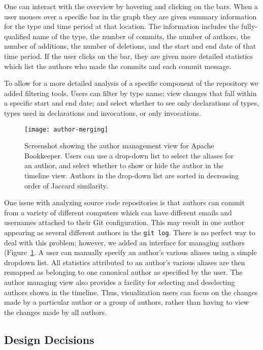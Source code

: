 One can interact with the overview by hovering and clicking on the bars. When a user mouses over a specific bar in the graph they are given summary information for the type and time period at that location. The information includes the fully-qualified name of the type, the number of commits, the number of authors, the number of additions, the number of deletions, and the start and end date of that time period. If the user clicks on the bar, they are given more detailed statistics which list the authors who made the commits and each commit message. 

To allow for a more detailed analysis of a specific component of the repository we added filtering tools. Users can filter by type name; view changes that fall within a specific start and end date; and select whether to see only declarations of types, types used in declarations and invocations, or only invocations.

\begin{figure}[tb]
\centering
\texttt{[image: author-merging]}
\caption{Screenshot showing the author management view for Apache Bookkeeper. Users can use a drop-down list to select the aliases for an author, and select whether to show or hide the author in the timeline view. Authors in the drop-down list are sorted in decreasing order of Jaccard similarity.}
\label{fig:author-merging}
\end{figure}

One issue with analyzing source code repositories is that authors can commit from a variety of different computers which can have different emails and usernames attached to their Git configuration. This may result in one author appearing as several different authors in the \texttt{git log}. There is no perfect way to deal with this problem; however, we added an interface for managing authors (Figure~\ref{fig:author-merging}. A user can manually specify an author's various aliases using a simple dropdown list. All statistics attributed to an author's various aliases are then remapped as belonging to one canonical author as specified by the user. The author managing view also provides a facility for selecting and deselecting authors shown in the timeline. Thus, visualization users can focus on the changes made by a particular author or a group of authors, rather than having to view the changes made by all authors.

\subsection{Design Decisions}

